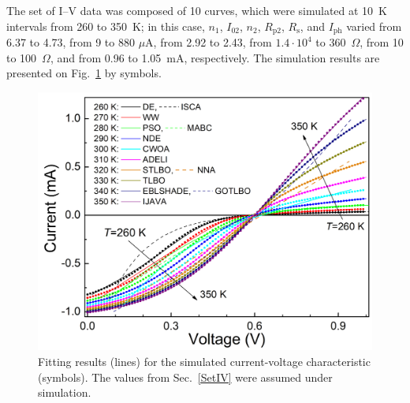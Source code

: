 \documentclass[a4paper,fleqn]{cas-dc}
\begin{document}
The set of I–V data was composed of 10 curves,
which were simulated at 10~K intervals from 260 to 350~K; 
in this case, 
$n_1$,
$I_{02}$,
$n_2$,
$R_\mathrm{p2}$,
$R_\mathrm{s}$,
and $I_\mathrm{ph}$
varied 
from 6.37 to 4.73,
from 9 to 880 $\mu$A,
from 2.92 to 2.43,
from $1.4\cdot10^4$ to 360~$\Omega$,
from 10 to 100~$\Omega$,
and from 0.96 to 1.05~mA, respectively.
The simulation results are presented on Fig.~\ref{figSetIV} by symbols.
\begin{figure}[]
	\centering
		\includegraphics[width=1.0\columnwidth]{IVset}
	  \caption{Fitting results (lines) for the simulated current-voltage characteristic (symbols).
             The values from  Sec.~\ref{SetIV} were assumed under simulation.}\label{figSetIV}
\end{figure}
\end{document}
